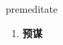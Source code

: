 
\begin{frame}
{\huge premeditate}
\begin{center}
\begin{enumerate}\Large
  \item \textbf{预谋}
\end{enumerate}
\end{center}
\end{frame}
